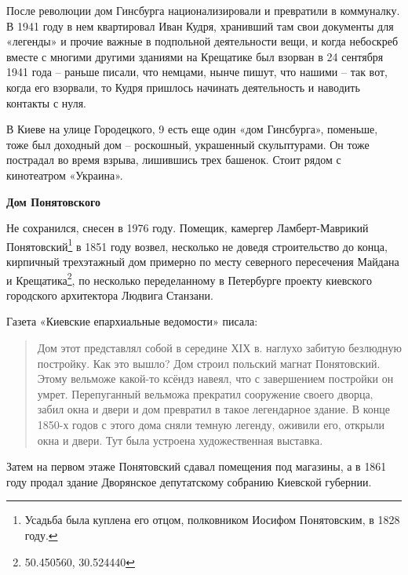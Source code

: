 После революции дом Гинсбурга национализировали и превратили в коммуналку. В 1941 году в нем квартировал Иван Кудря, хранивший там свои документы для «легенды» и прочие важные в подпольной деятельности вещи, и когда небоскреб вместе с многими другими зданиями на Крещатике был взорван в 24 сентября 1941 года – раньше писали, что немцами, нынче пишут, что нашими – так вот, когда его взорвали, то Кудря пришлось начинать деятельность и наводить контакты с нуля.
 
В Киеве на улице Городецкого, 9 есть еще один «дом Гинсбурга», поменьше, тоже был доходный дом – роскошный, украшенный скульптурами. Он тоже пострадал во время взрыва, лишившись трех башенок. Стоит рядом с кинотеатром «Украина».\\

\medskip


\textbf{Дом Понятовского}


Не сохранился, снесен в 1976 году. Помещик, камергер Ламберт-Маврикий Понятовский\footnote{Усадьба была куплена его отцом, полковником Иосифом Понятовским, в 1828 году.} в 1851 году возвел, несколько не доведя строительство до конца, кирпичный трехэтажный дом примерно по месту северного пересечения Майдана и Крещатика\footnote{50.450560, 30.524440}, по несколько переделанному в Петербурге проекту киевского городского архитектора Людвига Станзани.

Газета «Киевские епархиальные ведомости» писала:

\begin{quotation}
Дом этот представлял собой в середине ХІХ в. наглухо забитую безлюдную постройку. Как это вышло? Дом строил польский магнат Понятовский. Этому вельможе какой-то ксёндз навеял, что с завершением постройки он умрет. Перепуганный вельможа прекратил сооружение своего дворца, забил окна и двери и дом превратил в такое легендарное здание. В конце 1850-х годов с этого дома сняли темную легенду, оживили его, открыли окна и двери. Тут была устроена художественная выставка.\end{quotation}

Затем на первом этаже Понятовский сдавал помещения под магазины, а в 1861 году продал здание Дворянское депутатскому собранию Киевской губернии.

